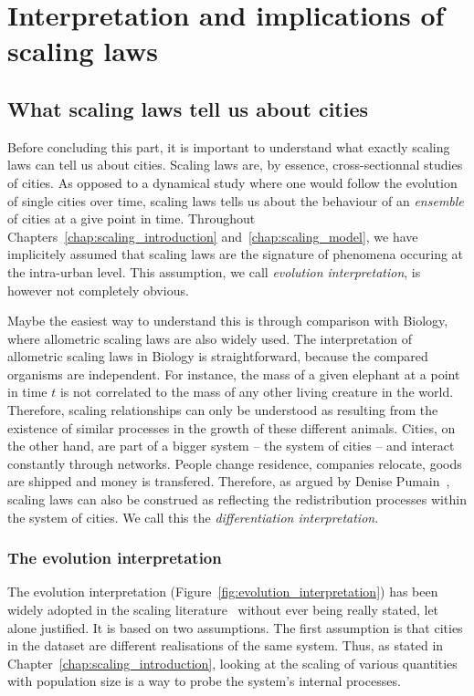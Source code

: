 \chapter{Interpretation and implications of scaling laws}
\label{chap:scaling_implications}

\bigskip

\section{What scaling laws tell us about cities}

Before concluding this part, it is important to understand what exactly scaling
laws can tell us about cities. Scaling laws are, by essence, cross-sectionnal
studies of cities. As opposed to a dynamical study where one would follow the
evolution of single cities over time, scaling laws tells us about the behaviour
of an \emph{ensemble} of cities at a give point in time. Throughout
Chapters~\ref{chap:scaling_introduction} and~\ref{chap:scaling_model}, we have
implicitely assumed that scaling laws are the signature of phenomena occuring at
the intra-urban level. This assumption, we call \emph{evolution interpretation},
is however not completely obvious. 

Maybe the easiest way to understand this is through comparison with
Biology, where allometric scaling laws are also widely used. The interpretation
of allometric scaling laws in Biology is straightforward, because the compared
organisms are independent. For instance, the mass of a given elephant at a point in
time $t$ is not correlated to the mass of any other living creature in the
world. Therefore, scaling relationships can only be understood as resulting from
the existence  of similar processes in the growth of these different animals.
Cities, on the other hand, are part of a bigger system -- the system of cities
-- and interact constantly through networks.  People change residence, companies
relocate, goods are shipped and money is transfered. Therefore, as argued by
Denise Pumain~\cite{Pumain:2012}, scaling laws can also be construed as
reflecting the redistribution processes within the system of cities. We call
this the \emph{differentiation interpretation}.

\subsection{The evolution interpretation}
\label{sub:the_evolution_interpretation}

The evolution interpretation (Figure~\ref{fig:evolution_interpretation}) has
been widely adopted in the scaling literature~\cite{Bettencourt:2007,
Bettencourt:2013,Louf:2014_scaling} without ever being really stated, let alone
justified. It is based on two assumptions. The first assumption is that cities in the dataset
are different realisations of the same system. Thus, as stated in
Chapter~\ref{chap:scaling_introduction}, looking at the scaling of various
quantities with population size is a way to probe the system's internal
processes.

